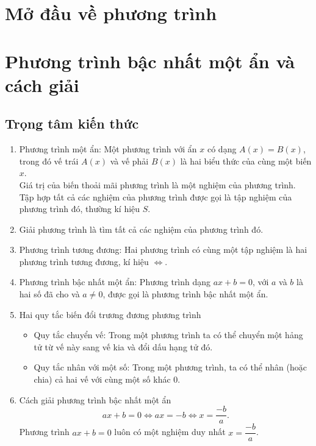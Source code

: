 \section{Mở đầu về phương trình}
\section{Phương trình bậc nhất một ẩn và cách giải}
\subsection{Trọng tâm kiến thức}
\begin{enumerate}
	\item Phương trình một ẩn: Một phương trình với ẩn $x$ có dạng $A(x)=B(x)$, trong đó vế trái $A(x)$ và vế phải $B(x)$ là hai biểu thức của cùng một biến $x$.\\
	Giá trị của biến thoải mãi phương trình là một nghiệm của phương trình.\\
	Tập hợp tất cả các nghiệm của phương trình được gọi là tập nghiệm của phương trình đó, thường kí hiệu $S$.
	\item Giải phương trình là tìm tất cả các nghiệm của phương trình đó.
	\item Phương trình tương đương: Hai phương trình có cùng một tập nghiệm là hai phương trình tương đương, kí hiệu $\Leftrightarrow $.
	\item Phương trình bậc nhất một ẩn: Phương trình dạng $ax+b=0$, với $a$ và $b$ là hai số đã cho và $a\ne 0$, được gọi là phương trình bậc nhất một ẩn.
	\item Hai quy tắc biến đổi trương đương phương trình
	\begin{itemize}
		\item Quy tắc chuyển vế: Trong một phương trình ta có thể chuyển một hảng tử từ vế này sang vế kia và đổi dấu hạng tử đó.
		\item Quy tắc nhân với một số: Trong một phương trình, ta có thể nhân (hoặc chia) cả hai vế với cùng một số khác $0$.
	\end{itemize}
	\item Cách giải phương trình bậc nhất một ẩn
	\[ax+b=0\Leftrightarrow ax=-b\Leftrightarrow x=\dfrac{-b}{a}.\]
	Phương trình $ax+b=0$ luôn có một nghiệm duy nhất $x=\dfrac{-b}{a}$.
\end{enumerate}
